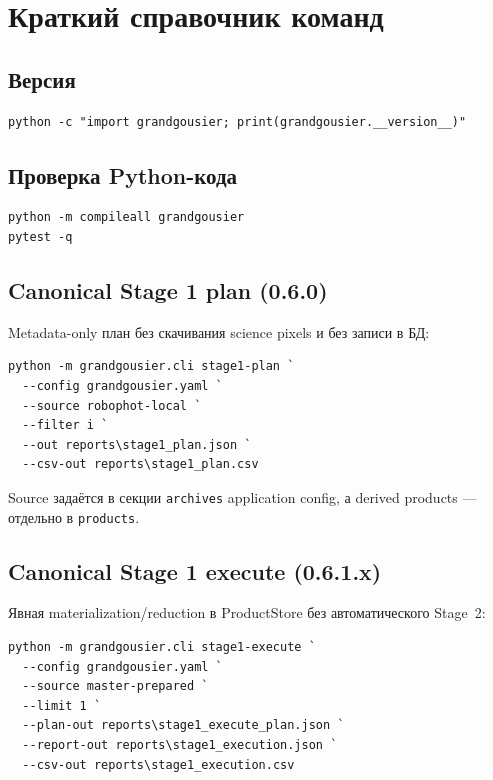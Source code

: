 \chapter{Краткий справочник команд}

\section{Версия}

\begin{lstlisting}
python -c "import grandgousier; print(grandgousier.__version__)"
\end{lstlisting}

\section{Проверка Python-кода}

\begin{lstlisting}
python -m compileall grandgousier
pytest -q
\end{lstlisting}


\section{Canonical Stage 1 plan (0.6.0)}

Metadata-only план без скачивания science pixels и без записи в БД:

\begin{lstlisting}
python -m grandgousier.cli stage1-plan `
  --config grandgousier.yaml `
  --source robophot-local `
  --filter i `
  --out reports\stage1_plan.json `
  --csv-out reports\stage1_plan.csv
\end{lstlisting}

Source задаётся в секции \texttt{archives} application config, а derived products --- отдельно в \texttt{products}.

\section{Canonical Stage 1 execute (0.6.1.x)}

Явная materialization/reduction в ProductStore без автоматического Stage~2:

\begin{lstlisting}
python -m grandgousier.cli stage1-execute `
  --config grandgousier.yaml `
  --source master-prepared `
  --limit 1 `
  --plan-out reports\stage1_execute_plan.json `
  --report-out reports\stage1_execution.json `
  --csv-out reports\stage1_execution.csv
\end{lstlisting}

